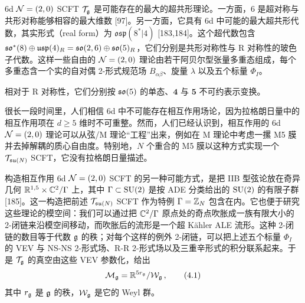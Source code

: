 
6d $\mathcal{N}=(2,0)$ SCFT $\mathcal{T}_{\mathfrak{g}}$ 是可能存在的最大的超共形理论。一方面，6 是超对称与共形对称能够相容的最大维数 [97]。另一方面，它具有 6d 中可能的最大超共形代数，其实形式（real form）为 $\mathfrak{osp}(8^*|4)$ [183,184]。这个超代数包含 $\mathfrak{so}^*(8)\oplus\mathfrak{usp}(4)_R=\mathfrak{so}(2,6)\oplus\mathfrak{so}(5)_R$，它们分别是共形对称性与 R 对称性的玻色子代数。这样一些自由的 $\mathcal{N}=(2,0)$ 理论由若干阿贝尔型张量多重态组成，每个多重态含一个实的自对偶 2-形式规范场 $B_{\alpha\beta}$、旋量 $\lambda$ 以及五个标量 $\Phi_I$。


相对于 R 对称性，它们分别按 $\mathfrak{so}(5)$ 的单态、$\mathbf{4}$ 与 $\mathbf{5}$ 不可约表示变换。

很长一段时间里，人们相信 6d 中不可能存在相互作用场论，因为拉格朗日量中的相互作用项在 $d\ge 5$ 维时不可重整。然而，人们已经认识到，相互作用的 6d $\mathcal{N}=(2,0)$ 理论可以从弦/M 理论“工程”出来，例如在 M 理论中考虑一摞 M5 膜并去掉解耦的质心自由度。特别地，$N$ 个重合的 M5 膜以这种方式实现一个 $\mathcal{T}_{\mathfrak{su}(N)}$ SCFT，它没有拉格朗日量描述。

构造相互作用 6d $\mathcal{N}=(2,0)$ SCFT 的另一种可能方式，是把 IIB 型弦论放在奇异几何 $\mathbb{R}^{1,5}\times\mathbb{C}^2/\Gamma$ 上，其中 $\Gamma\subset\mathrm{SU}(2)$ 是按 ADE 分类给出的 $\mathrm{SU}(2)$ 的有限子群 [185]。这一构造把前述 $\mathcal{T}_{\mathfrak{su}(N)}$ SCFT 作为特例 $\Gamma=\mathbb{Z}_N$ 包含在内。它也便于研究这些理论的模空间：我们可以通过把 $\mathbb{C}^2/\Gamma$ 原点处的奇点吹胀成一族有限大小的 2-闭链来沿模空间移动，而吹胀后的流形是一个超 Kähler ALE 流形。这种 2-闭链的数目等于代数 $\mathfrak{g}$ 的秩；对每个这样的例外 2-闭链，可以把上述五个标量 $\Phi_I$ 的 VEV 与 NS-NS 2-形式场、R-R 2-形式场以及三重辛形式的积分联系起来。于是 $\mathcal{T}_{\mathfrak{g}}$ 的真空由这些 VEV 参数化，给出
\begin{equation}
  \mathcal{M}_{\mathfrak{g}} = \mathbb{R}^{5r_{\mathfrak{g}}}/\mathcal{W}_{\mathfrak{g}}\,,
  \tag{4.1}
\end{equation}
其中 $r_{\mathfrak{g}}$ 是 $\mathfrak{g}$ 的秩，$\mathcal{W}_{\mathfrak{g}}$ 是它的 Weyl 群。


